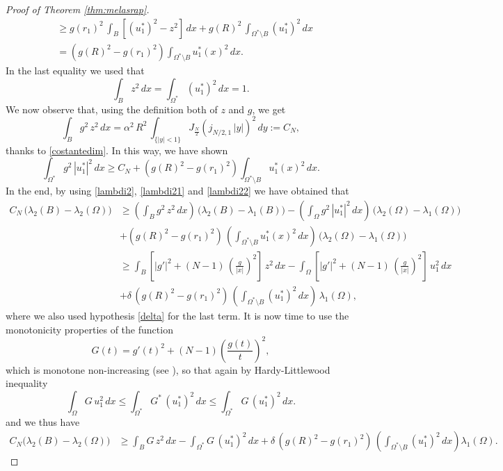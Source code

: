 \documentclass{amsart}
\theoremstyle{definition}
\numberwithin{equation}{section}
\begin{document}
\begin{proof}[Proof of Theorem \ref{thm:melasrap}]
\[\begin{split}
&\ge g(r_1)^2\, \int_{B} [(u_1^*)^2-z^2]\, dx +g(R)^2\,\int_{\Omega^*\setminus B} (u_1^*)^2\, dx\\
&= \left(g(R)^2-g(r_1)^2\right) \int_{\Omega^*\setminus B} u^*_1(x)^2\, dx.
\end{split}
\]
In the last equality we used that
\[
\int_B z^2\,dx=\int_{\Omega^*} (u^*_1)^2\,dx=1.
\]
We now observe that, using the definition both of $z$ and $g$, we get
\[
\int_B g^2\, z^2\, dx=\alpha^2\,R^{2}\,\int_{\{|y|<1\}} J_\frac{N}{2}(j_{N/2,1}\,|y|)^2\, dy:= C_N,
\]
thanks to \eqref{costantedim}. 
In this way, we have shown
\[
\int_{\Omega^*} g^2\, |u^*_1|^2\, dx\ge C_N +\left(g(R)^2-g(r_1)^2\right) \int_{\Omega^*\setminus B} u^*_1(x)^2\, dx. 
\]
In the end, by using \eqref{lambdi2}, \eqref{lambdi21} and \eqref{lambdi22} we have obtained that
\[
\begin{split}
C_N\,\Big(\lambda_2(B)-\lambda_2(\Omega)\Big)&\ge\left(\int_B g^2\, z^2\, dx\right)\,\Big(\lambda_2(B)-\lambda_1(B)\Big)-\left(\int_\Omega g^2\, |u_1^*|^2\, dx\right)\,\Big(\lambda_2(\Omega)-\lambda_1(\Omega)\Big)\\
&+\left(g(R)^2-g(r_1)^2\right)\,\left(\int_{\Omega^*\setminus B} u^*_1(x)^2\, dx\right)\,\Big(\lambda_2(\Omega)-\lambda_1(\Omega)\Big)\\
&\ge \displaystyle\int_B \left[|g'|^2+(N-1)\, \left(\frac{g}{|x|}\right)^2\right]\,z^2\, dx-\displaystyle\int_\Omega \left[|g'|^2+(N-1)\, \left(\frac{g}{|x|}\right)^2\right]\,u_1^2\, dx\\
&+\delta\,\left(g(R)^2-g(r_1)^2\right)\,\left(\int_{\Omega^*\setminus B} (u^*_1)^2\, dx\right)\,\lambda_1(\Omega),
\end{split}
\]
where we also used hypothesis \eqref{delta} for the last term.
It is now time to use the monotonicity properties of the function
\[
G(t)=g'(t)^2+(N-1)\left(\frac{g(t)}{t}\right)^2,
\]
which is monotone non-increasing (see \cite[Corollary 3.4]{MR1166646}), so that again by Hardy-Littlewood inequality
\[
\int_\Omega G\, u_1^2\, dx\le \int_{\Omega^*} G^*\, (u_1^*)^2\, dx\le \int_{\Omega^*} G\,(u_1^*)^2\,dx.
\]
and we thus have
\[
\begin{split}
C_N\Big(\lambda_2(B)-\lambda_2(\Omega)\Big)&\ge \int_B G\,z^2\, dx-\int_{\Omega^*} G\, (u^*_1)^2\, dx+\delta\,\left(g(R)^2-g(r_1)^2\right)\,\left(\int_{\Omega^*\setminus B} (u^*_1)^2\, dx\right)\lambda_1(\Omega).

\end{split}\]
\end{proof}
\end{document}
